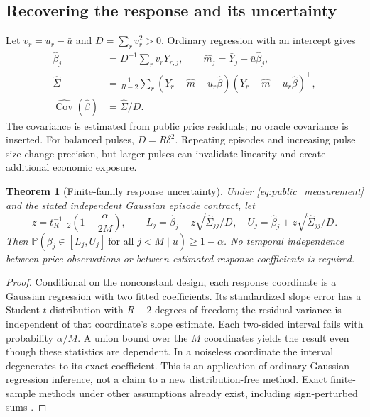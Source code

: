 \documentclass[11pt,a4paper]{article}
\newtheorem{theorem}{Theorem}[section]
\theoremstyle{definition}
\theoremstyle{remark}
\begin{document}
\subsection{Recovering the response and its uncertainty}
Let $v_r=u_r-\bar u$ and $D=\sum_r v_r^2>0$. Ordinary regression with an intercept gives
\begin{align}
 \widehat\beta_j&=D^{-1}\sum_r v_rY_{r,j},\qquad
 \widehat m_j=\bar Y_j-\bar u\widehat\beta_j,\\
 \widehat\Sigma&=\frac1{R-2}\sum_r
 (Y_r-\widehat m-u_r\widehat\beta)
 (Y_r-\widehat m-u_r\widehat\beta)^\top,\\
 \widehat{\operatorname{Cov}}(\widehat\beta)&=\widehat\Sigma/D.
 \label{eq:observed_covariance}
\end{align}
The covariance is estimated from public price residuals; no oracle covariance is inserted. For balanced pulses, $D=R\delta^2$. Repeating episodes and increasing pulse size change precision, but larger pulses can invalidate linearity and create additional economic exposure.

\begin{theorem}[Finite-family response uncertainty]
\label{thm:observable_ci}
Under \eqref{eq:public_measurement} and the stated independent Gaussian episode contract, let
\[
 z=t_{R-2}^{-1}\!\left(1-\frac{\alpha}{2M}\right),\qquad
 L_j=\widehat\beta_j-z\sqrt{\widehat\Sigma_{jj}/D},\quad
 U_j=\widehat\beta_j+z\sqrt{\widehat\Sigma_{jj}/D}.
\]
Then $\mathbb P(\beta_j\in[L_j,U_j]\ \text{for all }j<M\mid u)\ge1-\alpha$. No temporal independence between price observations or between estimated response coefficients is required.
\end{theorem}
\begin{proof}
Conditional on the nonconstant design, each response coordinate is a Gaussian regression with two fitted coefficients. Its standardized slope error has a Student-$t$ distribution with $R-2$ degrees of freedom; the residual variance is independent of that coordinate's slope estimate. Each two-sided interval fails with probability $\alpha/M$. A union bound over the $M$ coordinates yields the result even though these statistics are dependent. In a noiseless coordinate the interval degenerates to its exact coefficient. This is an application of ordinary Gaussian regression inference, not a claim to a new distribution-free method. Exact finite-sample methods under other assumptions already exist, including sign-perturbed sums \citep{csaji2015}.
\end{proof}
\end{document}
